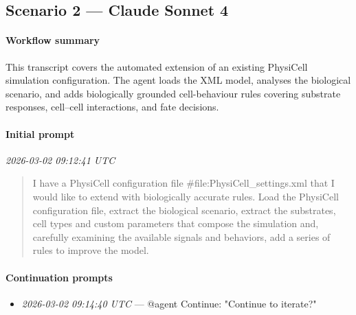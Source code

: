 \subsection{Scenario 2 — Claude Sonnet 4}

\paragraph{Workflow summary}
This transcript covers the automated extension of an existing PhysiCell simulation configuration. The agent loads the XML model, analyses the biological scenario, and adds biologically grounded cell-behaviour rules covering substrate responses, cell–cell interactions, and fate decisions.

\paragraph{Initial prompt} \hfill \textit{\small 2026-03-02 09:12:41 UTC}
\begin{quote}
I have a PhysiCell configuration file \#file:PhysiCell\_settings.xml  that I would like to extend with biologically accurate rules. Load the PhysiCell configuration file, extract the biological scenario, extract the substrates, cell types and custom parameters that compose the simulation and, carefully examining the available signals and behaviors, add a series of rules to improve the model.
\end{quote}

\paragraph{Continuation prompts}
\begin{itemize}
\item \textit{\small 2026-03-02 09:14:40 UTC} --- @agent Continue: "Continue to iterate?"
\end{itemize}

